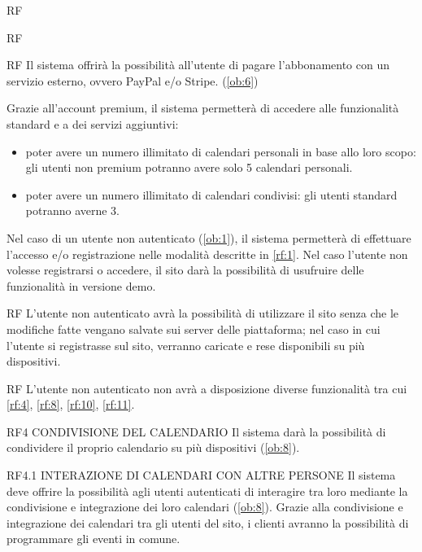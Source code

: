 \begin {listaPersonale}{RF}
\begin {listaPersonale2}{RF}
\begin {listaPersonale3}{RF}
Il sistema offrirà la possibilità all’utente di pagare l’abbonamento con un servizio esterno, ovvero PayPal e/o Stripe. (\ref{ob:6})


Grazie all’account premium, il sistema permetterà di accedere alle funzionalità standard e a dei servizi aggiuntivi:
\begin{itemize}
    \item poter avere un numero illimitato di calendari personali in base allo loro scopo: gli utenti non premium potranno avere solo 5 calendari personali.
    \item poter avere un numero illimitato di calendari condivisi: gli utenti standard potranno averne 3.
\end{itemize}


\end {listaPersonale3}
\end {listaPersonale2}

Nel caso di un utente non autenticato (\ref{ob:1}), il sistema permetterà di effettuare l’accesso e/o registrazione nelle modalità descritte in \ref{rf:1}. Nel caso l’utente non volesse registrarsi o accedere, il sito darà la possibilità di usufruire delle funzionalità in versione demo.

\begin{listaPersonale2}{RF}
    L'utente non autenticato avrà la possibilità di utilizzare il sito senza che le modifiche
    fatte vengano salvate sui server delle piattaforma; nel caso in cui l'utente si registrasse sul sito, verranno caricate e rese disponibili su più dispositivi.

\begin{listaPersonale3}{RF}
    L’utente non autenticato non avrà a disposizione diverse funzionalità tra cui \ref{rf:4}, \ref{rf:8}, \ref{rf:10}, \ref{rf:11}.
\end{listaPersonale3}

\end{listaPersonale2}

RF4 CONDIVISIONE DEL CALENDARIO 
Il sistema darà la possibilità di condividere il proprio calendario su più dispositivi (\ref{ob:8}).

RF4.1 INTERAZIONE DI CALENDARI CON ALTRE PERSONE
Il sistema deve offrire la possibilità agli utenti autenticati di interagire tra loro 
mediante la condivisione e integrazione dei loro calendari (\ref{ob:8}). 
Grazie alla condivisione e integrazione dei calendari tra gli utenti del sito, i clienti avranno la possibilità di programmare gli eventi in comune.


\end{listaPersonale}
